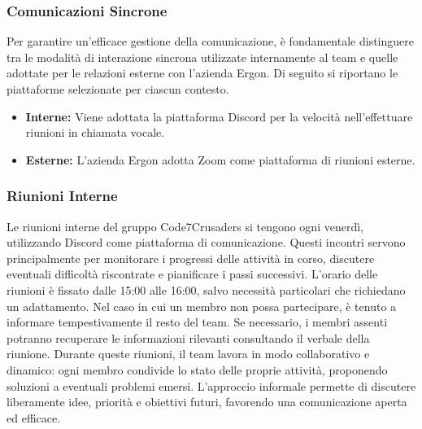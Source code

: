 \subsubsection{Comunicazioni Sincrone}
Per garantire un'efficace gestione della comunicazione, è fondamentale distinguere tra le modalità di interazione sincrona utilizzate internamente al team e quelle adottate per le relazioni esterne con l'azienda Ergon. Di seguito si riportano le piattaforme selezionate per ciascun contesto.
\begin{itemize}
    \item \textbf{Interne:} Viene adottata la piattaforma Discord per la velocità nell'effettuare riunioni in chiamata vocale.
    \item \textbf{Esterne:} L'azienda Ergon adotta Zoom come piattaforma di riunioni esterne.
\end{itemize}

\subsubsection{Riunioni Interne}
Le riunioni interne del gruppo Code7Crusaders si tengono ogni venerdì, utilizzando Discord come piattaforma di comunicazione. Questi incontri servono principalmente per monitorare i progressi delle attività in corso, discutere eventuali difficoltà riscontrate e pianificare i passi successivi. L’orario delle riunioni è fissato dalle 15:00 alle 16:00, salvo necessità particolari che richiedano un adattamento.
Nel caso in cui un membro non possa partecipare, è tenuto a informare tempestivamente il resto del team. Se necessario, i membri assenti potranno recuperare le informazioni rilevanti consultando il verbale della riunione.
Durante queste riunioni, il team lavora in modo collaborativo e dinamico: ogni membro condivide lo stato delle proprie attività, proponendo soluzioni a eventuali problemi emersi. L'approccio informale permette di discutere liberamente idee, priorità e obiettivi futuri, favorendo una comunicazione aperta ed efficace.

